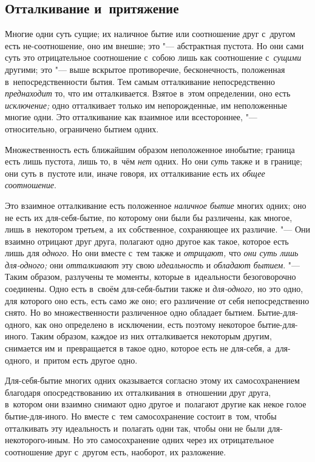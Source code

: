 \bigskip

\subsection{Отталкивание и~притяжение}


Многие одни суть сущие; их наличное бытие или соотношение друг с~другом есть
не-соотношение, оно им внешне; это "--- абстрактная пустота. Но они сами суть
это отрицательное соотношение с~собою лишь как соотношение с~{\em сущими}
другими; это "--- выше вскрытое противоречие, бесконечность, положенная
в~непосредственности бытия. Тем самым отталкивание непосредственно {\em
преднаходит} то, что им отталкивается. Взятое в~этом определении, оно есть
{\em исключение;} одно отталкивает только им непорожденные, им неположенные
многие одни. Это отталкивание как взаимное или всестороннее, "--- относительно,
ограничено бытием одних.

Множественность есть ближайшим образом неположенное инобытие; граница есть лишь
пустота, лишь то, в~чём {\em нет} одних. Но они {\em суть} также и~в границе;
они суть в~пустоте или, иначе говоря, их отталкивание есть их
{\em общее соотношение}.

Это взаимное отталкивание есть положенное {\em наличное бытие} многих одних;
оно не есть их для-себя-бытие, по которому они были бы различены, как многое,
лишь в~некотором третьем, а~их собственное, сохраняющее их различие. "--- Они
взаимно отрицают друг друга, полагают одно другое как такое, которое есть лишь
для {\em одного}. Но они вместе с~тем также и {\em отрицают,} что
{\em они суть лишь для-одного;} они {\em отталкивают} эту свою
{\em идеальность} и {\em обладают бытием}. "--- Таким образом, разлучены те
моменты, которые в~идеальности безоговорочно соединены. Одно есть в~своём
для-себя-бытии также и {\em для-одного,} но это одно, для которого оно есть,
есть само же оно; его различение от себя непосредственно снято. Но во
множественности различенное одно обладает бытием. Бытие-для-одного, как оно
определено в~исключении, есть поэтому некоторое бытие-для-иного. Таким образом,
каждое из них отталкивается некоторым другим, снимается им и~превращается в
такое одно, которое есть не для-себя, а~для-одного, и~притом есть другое одно.

Для-себя-бытие многих одних оказывается согласно этому их самосохранением
благодаря опосредствованию их отталкивания в~отношении друг друга, в~котором
они взаимно снимают одно другое и~полагают другие как некое голое
бытие-для-иного. Но вместе с~тем самосохранение состоит в~том, чтобы
отталкивать эту идеальность и~полагать одни так, чтобы они не были
для-некоторого-иным. Но это самосохранение одних через их отрицательное
соотношение друг с~другом есть, наоборот, их разложение.

